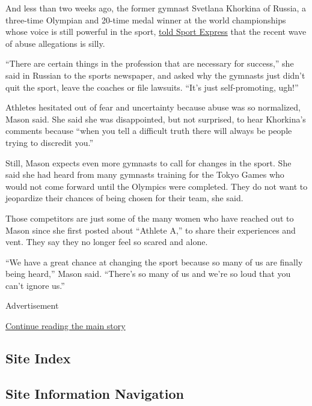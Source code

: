 And less than two weeks ago, the former gymnast Svetlana Khorkina of
Russia, a three-time Olympian and 20-time medal winner at the world
championships whose voice is still powerful in the sport,
\href{https://www.sport-express.ru/artistic-gymnastics/reviews/chto-dumaet-olimpiyskaya-chempionka-svetlana-horkina-o-harrasmente-v-sportivnoy-gimnastike-1694484/}{told
Sport Express} that the recent wave of abuse allegations is silly.

``There are certain things in the profession that are necessary for
success,'' she said in Russian to the sports newspaper, and asked why
the gymnasts just didn't quit the sport, leave the coaches or file
lawsuits. ``It's just self-promoting, ugh!''

Athletes hesitated out of fear and uncertainty because abuse was so
normalized, Mason said. She said she was disappointed, but not
surprised, to hear Khorkina's comments because ``when you tell a
difficult truth there will always be people trying to discredit you.''

Still, Mason expects even more gymnasts to call for changes in the
sport. She said she had heard from many gymnasts training for the Tokyo
Games who would not come forward until the Olympics were completed. They
do not want to jeopardize their chances of being chosen for their team,
she said.

Those competitors are just some of the many women who have reached out
to Mason since she first posted about ``Athlete A,'' to share their
experiences and vent. They say they no longer feel so scared and alone.

``We have a great chance at changing the sport because so many of us are
finally being heard,'' Mason said. ``There's so many of us and we're so
loud that you can't ignore us.''

Advertisement

\protect\hyperlink{after-bottom}{Continue reading the main story}

\hypertarget{site-index}{%
\subsection{Site Index}\label{site-index}}

\hypertarget{site-information-navigation}{%
\subsection{Site Information
Navigation}\label{site-information-navigation}}

